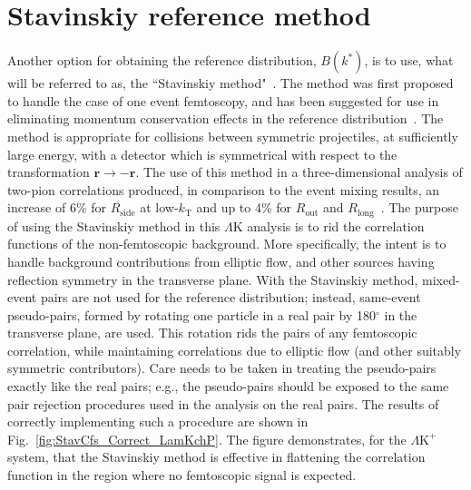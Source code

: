 \documentclass[ALICE,manyauthors]{cernphprep}
\newcommand{\LamK}{$\Lambda$K\xspace}
\newcommand{\LamKchP}{$\Lambda\mathrm{K^{+}}$\xspace}
\begin{document}


\newpage
\appendix
%
\renewcommand{\thesubfigure}{\thefigure(\alph{subfigure})}
\makeatletter
\renewcommand{\p@subfigure}{}
\renewcommand{\@thesubfigure}{(\alph{subfigure})\hskip\subfiglabelskip}
%

\section{Stavinskiy reference method}
\label{App:StavMethod}

Another option for obtaining the reference distribution, $B(k^{*})$, is to use, what will be referred to as, the ``Stavinskiy method"~\cite{Stavinskiy04}.
The method was first proposed to handle the case of one event femtoscopy, and has been suggested for use in eliminating momentum conservation effects in the reference distribution~\cite{Lisa:2005dd}.
The method is appropriate for collisions between symmetric projectiles, at sufficiently large energy, with a detector which is symmetrical with respect to the transformation $\mathbf{r} \rightarrow \mathbf{-r}$.
The use of this method in a three-dimensional analysis of two-pion correlations produced, in comparison to the event mixing results, an increase of 6\% for $R_{\mathrm{side}}$ at low-$k_{\mathrm{T}}$ and up to 4\% for $R_{\mathrm{out}}$ and $R_{\mathrm{long}}$~\cite{Aamodt:2011mr}.
The purpose of using the Stavinskiy method in this \LamK analysis is to rid the correlation functions of the non-femtoscopic background.  
More specifically, the intent is to handle background contributions from elliptic flow, and other sources having reflection symmetry in the transverse plane.  
With the Stavinskiy method, mixed-event pairs are not used for the reference distribution; instead, same-event pseudo-pairs, formed by rotating one particle in a real pair by 180$^\circ$ in the transverse plane, are used.  
This rotation rids the pairs of any femtoscopic correlation, while maintaining correlations due to elliptic flow (and other suitably symmetric contributors).
Care needs to be taken in treating the pseudo-pairs exactly like the real pairs; e.g., the pseudo-pairs should be exposed to the same pair rejection procedures used in the analysis on the real pairs.
The results of correctly implementing such a procedure are shown in Fig.~\ref{fig:StavCfs_Correct_LamKchP}.
The figure demonstrates, for the \LamKchP system, that the Stavinskiy method is effective in flattening the correlation function in the region where no femtoscopic signal is expected.
\end{document}

